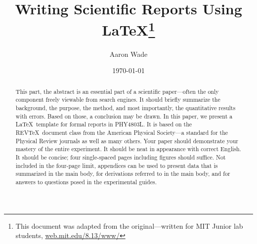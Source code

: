 \usepackage{chapterbib}    %
\usepackage{color}         %
\usepackage{graphics}      %
\usepackage[pdftex]{graphicx}      %
\usepackage{longtable}     %
\usepackage{epsf}          %
\usepackage{bm}            %
\usepackage{verbatim}			%
\usepackage[colorlinks=true]{hyperref}  %

\addtolength\topmargin{-.5\topmargin} %

%
%


\title{Writing Scientific Reports Using \LaTeX\footnote{
This document was adapted from the original---written for MIT Junior lab students,
\url{web.mit.edu/8.13/www/}
}}
\author         {Aaron Wade}
\date{\today}


\begin{abstract}
This part, the abstract is an essential part of a scientific paper---often the only
component freely viewable from search engines.
It should briefly summarize the background, the purpose,
the method, and most importantly,
the quantitative results with errors.
Based on those, a conclusion may be drawn.
In this paper, we present a \LaTeX\ template for formal reports in PHY4803L.
It is based on the REV\TeX\ document class from the
American Physical Society---a standard for the
Physical Review journals as well as many others.
Your paper should demonstrate your mastery of the entire experiment.
It should be neat in appearance with correct English.
It should be concise; four single-spaced pages including figures should suffice.
Not included in the four-page limit, appendices can be used to
present data that is summarized in the main body,
for derivations referred to in the main body,
and for answers to questions posed in the experimental guides.

\end{abstract}

